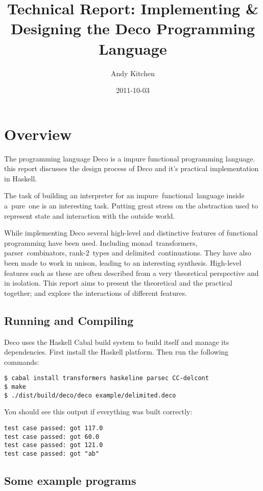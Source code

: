 \documentclass[]{article}
\title{Technical Report: Implementing \& Designing the Deco Programming Language}
\author{Andy Kitchen}
\date{2011-10-03}
\begin{document}
\maketitle

\section{Overview}

The programming language Deco is a impure functional programming language.
this report discusses the design process of Deco and it's practical
implementation in Haskell.

The task of building an interpreter for an impure~functional~language inside
a~pure~one is an interesting task. Putting great stress on the abstraction
used to represent state and interaction with the outside world.

While implementing Deco several high-level and distinctive features of
functional programming have been used. Including monad~transformers,
parser~combinators, rank-2~types and delimited~continuations. They have also
been made to work in unison, leading to an interesting synthesis. High-level
features such as these are often described from a very theoretical perspective
and in isolation. This report aims to present the theoretical and the
practical together; and explore the interactions of different features.

\subsection{Running and Compiling}

Deco uses the Haskell Cabal build system to build itself and manage its
dependencies. First install the Haskell platform. Then run the following
commands:

\lstset{language=bash}
\begin{verbatim}
$ cabal install transformers haskeline parsec CC-delcont
$ make
$ ./dist/build/deco/deco example/delimited.deco 
\end{verbatim}

You should see this output if everything was built correctly:

\begin{verbatim}
test case passed: got 117.0
test case passed: got 60.0
test case passed: got 121.0
test case passed: got "ab"
\end{verbatim}


\subsection{Some example programs}
\end{document}
